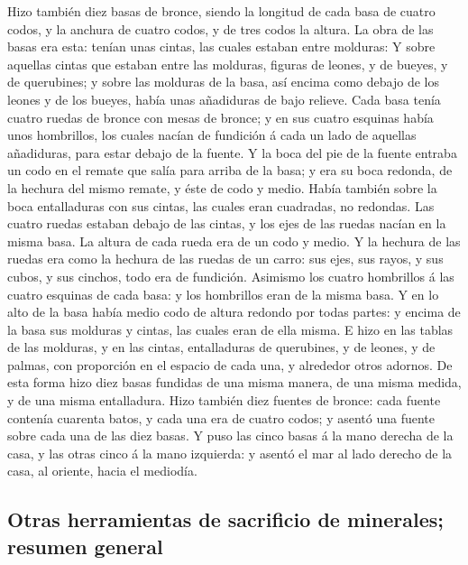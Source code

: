 Hizo también diez basas de bronce, siendo la longitud de
cada basa de cuatro codos, y la anchura de cuatro codos, y de tres codos
la altura.  La obra de las basas era esta: tenían unas
cintas, las cuales estaban entre molduras:  Y sobre
aquellas cintas que estaban entre las molduras, figuras de leones, y de
bueyes, y de querubines; y sobre las molduras de la basa, así encima
como debajo de los leones y de los bueyes, había unas añadiduras de bajo
relieve.  Cada basa tenía cuatro ruedas de bronce con mesas
de bronce; y en sus cuatro esquinas había unos hombrillos, los cuales
nacían de fundición á cada un lado de aquellas añadiduras, para estar
debajo de la fuente.  Y la boca del pie de la fuente
entraba un codo en el remate que salía para arriba de la basa; y era su
boca redonda, de la hechura del mismo remate, y éste de codo y medio.
Había también sobre la boca entalladuras con sus cintas, las cuales eran
cuadradas, no redondas.  Las cuatro ruedas estaban debajo
de las cintas, y los ejes de las ruedas nacían en la misma basa. La
altura de cada rueda era de un codo y medio.  Y la hechura
de las ruedas era como la hechura de las ruedas de un carro: sus ejes,
sus rayos, y sus cubos, y sus cinchos, todo era de fundición.
 Asimismo los cuatro hombrillos á las cuatro esquinas de
cada basa: y los hombrillos eran de la misma basa.  Y en lo
alto de la basa había medio codo de altura redondo por todas partes: y
encima de la basa sus molduras y cintas, las cuales eran de ella misma.
 E hizo en las tablas de las molduras, y en las cintas,
entalladuras de querubines, y de leones, y de palmas, con proporción en
el espacio de cada una, y alrededor otros adornos.  De esta
forma hizo diez basas fundidas de una misma manera, de una misma medida,
y de una misma entalladura.  Hizo también diez fuentes de
bronce: cada fuente contenía cuarenta batos, y cada una era de cuatro
codos; y asentó una fuente sobre cada una de las diez basas.
 Y puso las cinco basas á la mano derecha de la casa, y las
otras cinco á la mano izquierda: y asentó el mar al lado derecho de la
casa, al oriente, hacia el mediodía.

\hypertarget{otras-herramientas-de-sacrificio-de-minerales-resumen-general}{%
\subsection{Otras herramientas de sacrificio de minerales; resumen
general}\label{otras-herramientas-de-sacrificio-de-minerales-resumen-general}}

